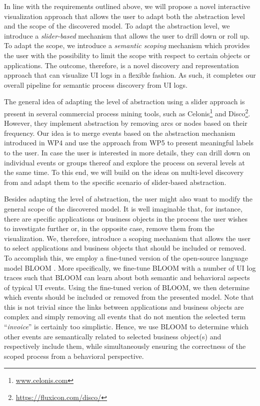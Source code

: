 In line with the requirements outlined above, we will propose a novel interactive visualization approach that allows the user to adapt both the abstraction level and the scope of the discovered model. To adapt the abstraction level, we introduce a \textit{slider-based} mechanism that allows the user to drill down or roll up. To adapt the scope, we introduce a \textit{semantic scoping} mechanism which provides the user with the possibility to limit the scope with respect to certain objects or applications. The outcome, therefore, is a novel discovery and representation approach that can visualize UI logs in a flexible fashion. As such, it completes our overall pipeline for semantic process discovery from UI logs. 

 The general idea of adapting the level of abstraction using a slider approach is present in several commercial process mining tools, such as Celonis\footnote{\url{www.celonis.com}} and Disco\footnote{\url{https://fluxicon.com/disco/}}. However, they implement abstraction by removing arcs or nodes based on their frequency. Our idea is to merge events based on the abstraction mechanism introduced in WP4 and use the approach from WP5 to present meaningful labels to the user. In case the user is interested in more details, they can drill down on individual events or groups thereof and explore the process on several levels at the same time. To this end, we will build on the ideas on multi-level discovery from \cite{leemans2020using} and adapt them to the specific scenario of slider-based abstraction. 

 Besides adapting the level of abstraction, the user might also want to modify the general scope of the discovered model. It is well imaginable that, for instance, there are specific applications or business objects in the process the user wishes to investigate further or, in the opposite case, remove them from the visualization. We, therefore, introduce a scoping  mechanism that allows the user to select applications and business objects that should be included or removed. To accomplish this, we employ a fine-tuned version of the open-source language model BLOOM \cite{scao2022bloom}. More specifically, we fine-tune BLOOM with a number of UI log traces such that BLOOM can learn about both semantic and behavioral aspects of typical UI events. Using the fine-tuned verion of BLOOM, we then determine which events should be included or removed from the presented model. Note that this is not trivial since the links between applications and business objects are complex and simply removing all events that do not mention the selected term ``\textit{invoice}'' is certainly too simplistic. Hence, we use BLOOM to determine which other events are semantically related to selected business object(s) and respectively include them, while simultaneously ensuring the correctness of the scoped process from a behavioral perspective.  

